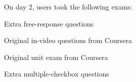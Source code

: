 \documentclass{sigchi}
\begin{document}



On day 2, users took the following exams:

\begin{compactenum}
\item Extra free-response questions %
\item Original in-video questions from Coursera%
\item Original unit exam from Coursera%
\item Extra multiple-checkbox questions %
\end{compactenum}

\end{document}
